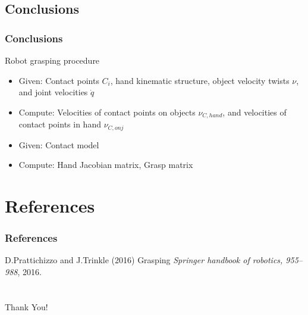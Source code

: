 \documentclass{beamer}
\begin{document}

\subsection{Conclusions}
\begin{frame}
\frametitle{Conclusions}
Robot grasping procedure
\begin{itemize}
\item Given: Contact points $C_i$, hand kinematic structure, object velocity twists $\nu$, and joint velocities $\dot{q}$ 
\item Compute: Velocities of contact points on objects $\nu_{C,hand}$, and velocities of contact points in hand $\nu_{C,onj}$ \vspace{0.2cm}
\item Given: Contact model 
\item Compute: Hand Jacobian matrix, Grasp matrix \vspace{0.2cm}
\end{itemize}
\end{frame}


\section{References}

\begin{frame}
\frametitle{References}
\footnotesize{
\begin{thebibliography}{99}

 D.Prattichizzo and J.Trinkle (2016)
\newblock Grasping
\newblock \emph{Springer handbook of robotics, 955--988}, 2016.

\end{thebibliography}
}
\end{frame}

\section{}
\begin{frame}
\begin{center}
\Huge {Thank You!}
\end{center}
\end{frame}

\end{document}
